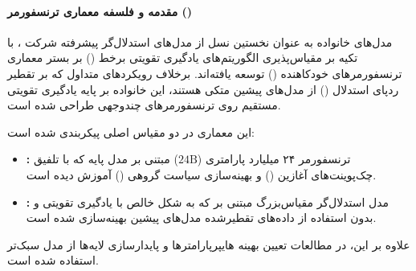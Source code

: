 \item {}

\paragraph*{مقدمه و فلسفه معماری ترنسفورمر ()}
مدل‌های خانواده  \cite{magistral2025} به عنوان نخستین نسل از مدل‌های استدلال‌گر پیشرفته شرکت ، با تکیه بر مقیاس‌پذیری الگوریتم‌های یادگیری تقویتی برخط () بر بستر معماری ترنسفورمرهای خودکاهنده () توسعه یافته‌اند. برخلاف رویکردهای متداول که بر تقطیر ردپای استدلال () از مدل‌های پیشین متکی هستند، این خانواده بر پایه یادگیری تقویتی مستقیم روی ترنسفورمرهای چندوجهی طراحی شده است. 

این معماری در دو مقیاس اصلی پیکربندی شده است:
\begin{itemize}
    \item \textbf{:} ترنسفورمر ۲۴ میلیارد پارامتری ($24\text{B}$) مبتنی بر مدل پایه  که با تلفیق چک‌پوینت‌های آغازین () و بهینه‌سازی سیاست گروهی () آموزش دیده است.
    \item \textbf{:} مدل استدلال‌گر مقیاس‌بزرگ مبتنی بر  \cite{mistralai2025medium3} که به شکل خالص با یادگیری تقویتی و بدون استفاده از داده‌های تقطیرشده مدل‌های پیشین بهینه‌سازی شده است.
\end{itemize}

علاوه بر این، در مطالعات تعیین بهینه هایپرپارامترها و پایدارسازی لایه‌ها از مدل سبک‌تر  استفاده شده است.


